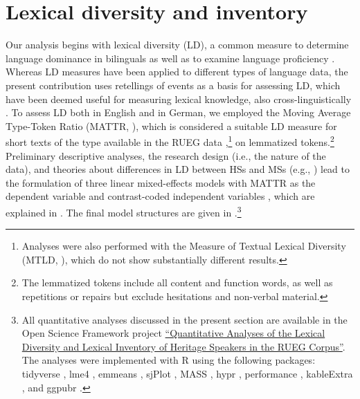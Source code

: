 \documentclass[output=paper,colorlinks,citecolor=brown]{langscibook}
\begin{document}

\section{Lexical diversity and inventory} \label{sec:kelleretal:lex-div-inventory}

Our analysis begins with lexical diversity (LD), a common measure to determine language dominance in bilinguals \citep{TreffersKorybski2016Measures} as well as to examine language proficiency \citep{MalvernRichads2002AccommodationLD, Jarvis2013DiversityinLD}. Whereas LD measures have been applied to different types of language data, the present contribution uses retellings of events as a basis for assessing LD, which have been deemed useful for measuring lexical knowledge, also cross-linguistically \citep[321]{SimonCereijidoGutiérrezClellen2009LexicalGrammatical}. To assess LD both in English and in German, we employed the Moving Average Type-Token Ratio (MATTR, \citealt{ConvingtonMcFall2010MATTR}), which is considered a suitable LD measure for short texts of the type available in the RUEG data \citep{ZenkerKyle2021MinimumText},\footnote{Analyses were also performed with the Measure of Textual Lexical Diversity (MTLD, \citealt{MccarthyJarvis2010MTLD}), which do not show substantially different results.} on lemmatized tokens.\footnote{The lemmatized tokens include all content and function words, as well as repetitions or repairs but exclude hesitations and non-verbal material.} Preliminary descriptive analyses, the research design (i.e., the nature of the data), and theories about differences in LD between HSs and MSs (e.g., \citealt{BonvinEtAl2018Entwicklung,GharibiBoers2019LexicalRichness}) lead to the formulation of three linear mixed-effects models with MATTR as the dependent variable and contrast-coded independent variables \citep{Schadetal2019contrasts}, which are explained in . The final model structures are given in .\footnote{All quantitative analyses discussed in the present section are available in the Open Science Framework project \href{https://osf.io/k89dc/?view_only=c2521da400ee4edd9667c264c5fad6ea}{``Quantitative Analyses of the Lexical Diversity and Lexical Inventory of Heritage Speakers in the RUEG Corpus''}. The analyses were implemented with R \citep{Rcitation} using the following packages: tidyverse \citep{tidyverse}, lme4 \citep{lme4}, emmeans \citep{emmeans}, sjPlot \citep{sjPlot}, \textsc{MASS} \citep{MASS}, hypr \citep{hypr}, performance \citep{performance}, kableExtra \citep{kableExtra}, and ggpubr \citep{ggpubr}.}
\end{document}
